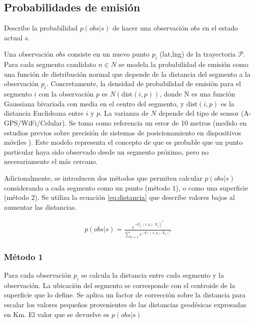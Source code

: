 \subsection{Probabilidades de emisión}\label{ssec:emission}

Describe la probabilidad $p(obs|s)$ de hacer una observación $obs$ en el estado actual $s$.

Una observación $obs$ consiste en un nuevo punto $p_i$ (lat,lng) de la trayectoria $\mathcal{P}$. Para cada segmento candidato $n \in N$ se modela la probabilidad de emisión como una función de distribución normal que depende de la distancia del segmento a la observación $p_i$. Concretamente, la densidad de probabilidad de emisión para el segmento $i$ con la observación $p$ es $N(\mathrm{dist}(i,p))$, donde N es una función Gaussiana bivariada con media en el centro del segmento, y $\mathrm{dist}(i,p)$ es la distancia Euclideana entre $i$ y $p$. La varianza de $N$ depende del tipo de sensor (A-GPS/WiFi/Celular). Se toma como referencia un error de 10 metros (medido en estudios previos sobre precisión de sistemas de posicionamiento en dispositivos móviles \cite{jones2015horizontal}).
Este modelo representa el concepto de que es probable que un punto particular haya sido observado desde un segmento próximo, pero no necesariamente el más cercano.

Adicionalmente, se introducen dos métodos que permiten calcular $p(obs|s)$ considerando a cada segmento como un punto (método 1), o como una superficie (método 2). Se utiliza la ecuación \eqref{eq:distancia} que describe valores bajos al aumentar las distancias.  \par

\begin{align}\label{eq:distancia}
 p(obs|s)= \frac{e^{-d((x,y);X_j)^2}}{\sum\limits_{k=1}e^{-d((x,y);X_k)^2}} 
\end{align}

\subsubsection{Método 1}\label{sssec:metodo1}
Para cada observación $p_i$ se calcula la distancia entre cada segmento y la observación. La ubicación del segmento se corresponde con el centroide de la superficie que lo define. Se aplica un factor de corrección sobre la distancia para escalar los valores pequeños provenientes de las distancias geodésicas expresadas en Km. El valor que se devuelve es $p(obs|s)$

